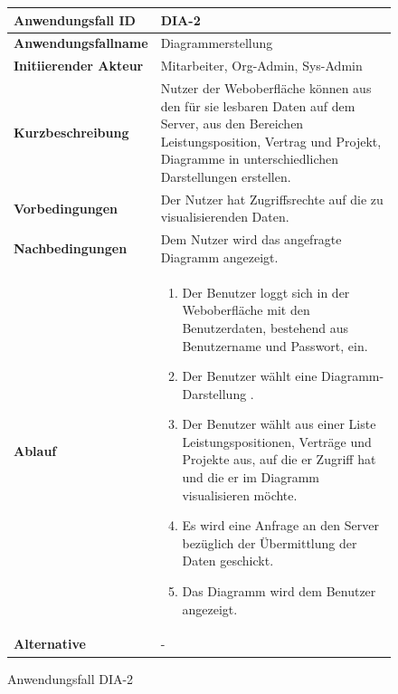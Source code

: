 \newpage

\begin{figure}[h]
	\centering
	\begin{tabularx}{\textwidth}{ X | X }
		\textbf{Anwendungsfall ID} & DIA-2 \\ \hline
		\textbf{Anwendungsfallname} & Diagrammerstellung\\ \hline
		\textbf{Initiierender Akteur} & Mitarbeiter, Org-Admin, Sys-Admin \\ \hline
		\textbf{Kurzbeschreibung} & Nutzer der Weboberfläche können aus den für sie lesbaren Daten auf dem Server, aus den Bereichen Leistungsposition, Vertrag und Projekt, Diagramme in unterschiedlichen Darstellungen erstellen.  \\ \hline
		\textbf{Vorbedingungen} & Der Nutzer hat Zugriffsrechte auf die zu visualisierenden Daten.  \\ \hline
		\textbf{Nachbedingungen} &  Dem Nutzer wird das angefragte Diagramm angezeigt.  \\ \hline
		\textbf{Ablauf} &
		\begin{enumerate}
			\item Der Benutzer loggt sich in der Weboberfläche mit den Benutzerdaten, bestehend aus Benutzername und Passwort, ein.
			\item Der Benutzer wählt eine Diagramm-Darstellung .
			\item Der Benutzer wählt aus einer Liste Leistungspositionen, Verträge und Projekte aus, auf die er Zugriff hat und die er im Diagramm visualisieren möchte.
			\item Es wird eine Anfrage an den Server bezüglich der Übermittlung der Daten geschickt.
			\item Das Diagramm wird dem Benutzer angezeigt.
		\end{enumerate} \\ \hline

		\textbf{Alternative} & - \\ \hline
	\end{tabularx}
	\caption{Anwendungsfall DIA-2}
	\label{fig:anwendungsfall-DIA-2}
	
	
\end{figure}


\newpage

